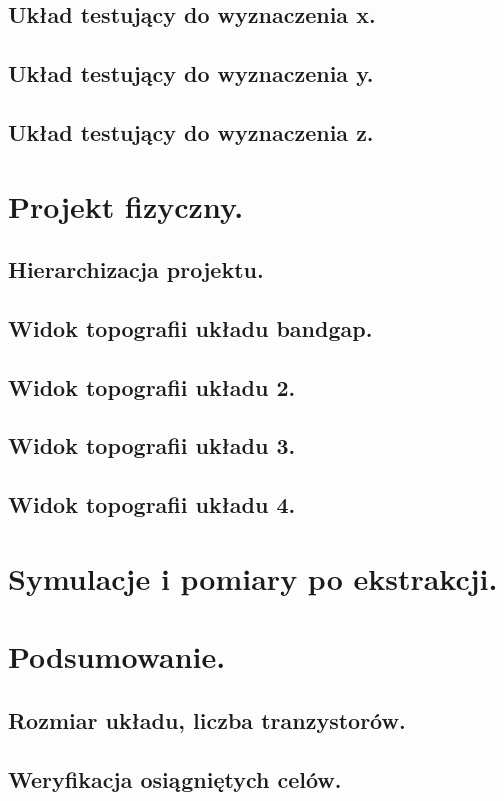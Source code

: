 \documentclass[10pt,a4paper]{report}
\begin{document}
	\section{Układ testujący do wyznaczenia x.}
	\section{Układ testujący do wyznaczenia y.}
	\section{Układ testujący do wyznaczenia z.}
	
	\chapter{Projekt fizyczny.}
	\section{Hierarchizacja projektu.}
	\section{Widok topografii układu bandgap.}
	\section{Widok topografii układu 2.}
	\section{Widok topografii układu 3.}
	\section{Widok topografii układu 4.}
	
	\chapter{Symulacje i pomiary po ekstrakcji.}
	
	\chapter{Podsumowanie.}
	\section{Rozmiar układu, liczba tranzystorów.}
	\section{Weryfikacja osiągniętych celów.}
\end{document}
